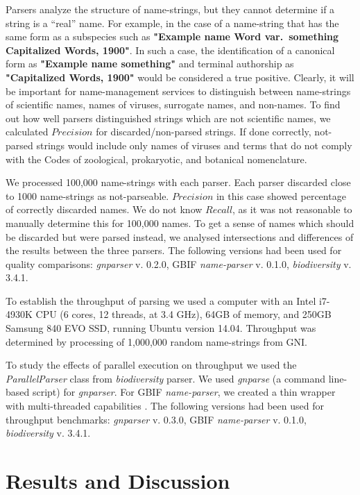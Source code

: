 \documentclass{bmcart}
\begin{document}
Parsers analyze the structure of name-strings, but they cannot determine if a
string is a ``real'' name. For example, in the case of a name-string that has
the same form as a subspecies such as \textbf{"Example name Word var.\
something Capitalized Words, 1900"}. In such a case, the identification of a
canonical form as \textbf{"Example name something"} and terminal authorship as
\textbf{"Capitalized Words, 1900"} would be considered a true positive.
Clearly, it will be important for name-management services to distinguish
between name-strings of scientific names, names of viruses, surrogate names,
and non-names. To find out how well parsers distinguished strings which are not
scientific names, we calculated $Precision$ for discarded/non-parsed strings.
If done correctly, not-parsed strings would include only names of viruses and
terms that do not comply with the Codes of zoological, prokaryotic, and
botanical nomenclature.

We processed 100,000 name-strings with each parser. Each parser discarded
close to 1000 name-strings as not-parseable. $Precision$ in this case showed
percentage of correctly discarded names. We do not know $Recall$, as it was
not reasonable to manually determine this for 100,000 names. To get a sense of
names which should be discarded but were parsed instead, we analysed
intersections and differences of the results between the three parsers. The
following versions had been used for quality comparisons: \textit{gnparser} v.
0.2.0, GBIF \textit{name-parser} v. 0.1.0, \textit{biodiversity} v. 3.4.1.

To establish the throughput of parsing we used a computer with an Intel
i7-4930K CPU (6 cores, 12 threads, at 3.4 GHz), 64GB of memory, and 250GB
Samsung 840 EVO SSD, running Ubuntu version 14.04. Throughput was determined by
processing of 1,000,000 random name-strings from GNI.

To study the effects of parallel execution on throughput we used the
\textit{ParallelParser} class from \textit{biodiversity} parser. We used
\textit{gnparse} (a command line-based script) for \textit{gnparser}. For GBIF
\textit{name-parser}, we created a thin wrapper with multi-threaded
capabilities \cite{gbifparser}. The following versions had been used for
throughput benchmarks: \textit{gnparser} v. 0.3.0, GBIF \textit{name-parser} v.
0.1.0, \textit{biodiversity} v. 3.4.1.

\section*{Results and Discussion}\label{sec:discussion}
\end{document}
